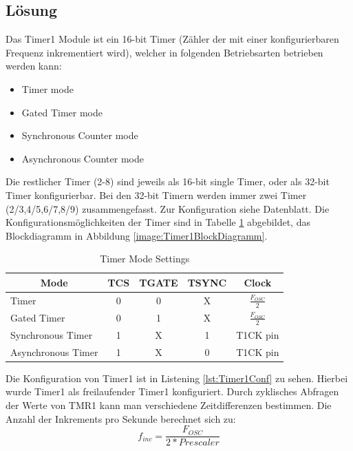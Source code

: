 \subsection{Lösung}
Das Timer1 Module ist ein 16-bit Timer (Zähler der mit einer konfigurierbaren Frequenz inkrementiert wird), welcher in folgenden Betriebsarten betrieben werden kann:
\begin{itemize}
	\item Timer mode
	\item Gated Timer mode
	\item Synchronous Counter mode
	\item Asynchronous Counter mode
\end{itemize}
Die restlicher Timer (2-8) sind jeweils als 16-bit single Timer, oder als 32-bit Timer konfigurierbar. Bei den 32-bit Timern werden immer zwei Timer (2/3,4/5,6/7,8/9) zusammengefasst. Zur Konfiguration siehe Datenblatt.
\newline
Die Konfigurationsmöglichkeiten der Timer sind in Tabelle \ref{tab:timermodesettings} abgebildet, das Blockdiagramm in Abbildung \ref{image:Timer1BlockDiagramm}.\newline
\begin{table}[h]
	\centering
	\begin{tabular}{|c|c|c|c|c|}
		\hline 
		\textbf{Mode} & \textbf{TCS} & \textbf{TGATE} & \textbf{TSYNC} & \multicolumn{1}{|c|}{Clock} \\ 
		\hline 
		\multicolumn{1}{|l|}{Timer} & 0 & 0 & X&$\frac{F_{OSC}}{2}$\\ 
		\hline 
		\multicolumn{1}{|l|}{Gated Timer}  & 0 & 1 & X&$\frac{F_{OSC}}{2}$ \\ 
		\hline 
		\multicolumn{1}{|l|}{Synchronous Timer} & 1 & X & 1& T1CK pin \\ 
		\hline 
		\multicolumn{1}{|l|}{Asynchronous Timer} & 1 & X & 0& T1CK pin\\ 
		\hline 
	\end{tabular} 
	\caption{Timer Mode Settings}
	\label{tab:timermodesettings}
\end{table}
\newline Die Konfiguration von Timer1 ist in Listening \ref{lst:Timer1Conf} zu sehen. Hierbei wurde Timer1 als freilaufender Timer1 konfiguriert. Durch zyklisches Abfragen der Werte von TMR1 kann man verschiedene Zeitdifferenzen bestimmen. Die Anzahl der Inkrements pro Sekunde berechnet sich zu:
\begin{equation}\label{key}
f_{inc}=\frac{F_{OSC}}{2*Prescaler}
\end{equation}
